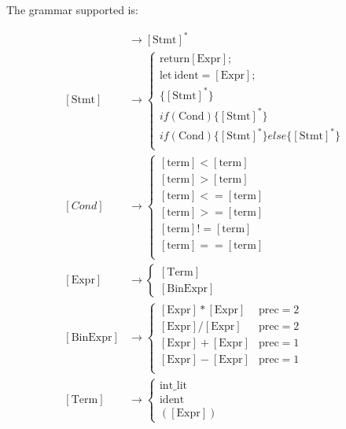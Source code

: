 \documentclass{article}
\begin{document}
The grammar supported is:

\begin{align*}
    [\text{Prog}] &\to [\text{Stmt}]^* \\
    [\text{Stmt}] &\to
    \begin{cases}
    \text{return} [\text{Expr}]; \\
    \text{let}\ \text{ident} = [\text{Expr}];\\
    \{ [\text{Stmt}]^*\}\\
     if( \text{Cond} ) \{ [\text{Stmt}]^*\} \\
     if( \text{Cond} ) \{ [\text{Stmt}]^*\}else\{[\text{Stmt}]^*\} \\
    \end{cases} \\
    [Cond] &\to
    \begin{cases}
    [\text{term}] < [\text{term}]\\
    [\text{term}] > [\text{term}]\\
    [\text{term}] <= [\text{term}]\\
    [\text{term}] >= [\text{term}]\\
    [\text{term}] != [\text{term}]\\
    [\text{term}] == [\text{term}]\\
    \end{cases}\\
    [\text{Expr}] &\to
    \begin{cases}
    [\text{Term}] \\
    [\text{BinExpr}]
    \end{cases} \\
    [\text{BinExpr}] &\to
    \begin{cases}
    [\text{Expr}] * [\text{Expr}] & \text{prec} = 2 \\
    [\text{Expr}] / [\text{Expr}] & \text{prec} = 2 \\
    [\text{Expr}] + [\text{Expr}] & \text{prec} = 1 \\
    [\text{Expr}] - [\text{Expr}] & \text{prec} = 1 \\
    \end{cases} \\
    [\text{Term}] &\to
    \begin{cases}
    \text{int\_lit} \\
    \text{ident} \\
    ([\text{Expr}])
    \end{cases}
    \end{align*}
\end{document}
